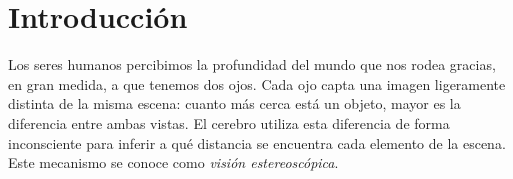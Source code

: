 \documentclass[
10pt, %
a4paper, %
oneside, %
headinclude,footinclude, %
BCOR=5mm, %
]{scrartcl}
\title{\normalfont\spacedallcaps{Geometría epipolar}} %
\author{
    \spacedlowsmallcaps{Álvaro Acedo Blanco} \\ 
    \spacedlowsmallcaps{Daniel Czepiel Babiarz} \\ 
    \spacedlowsmallcaps{Séan Beltrán Amor}
}
\date{} %
\begin{document}

\renewcommand{\sectionmark}[1]{\markright{\spacedlowsmallcaps{#1}}} %
\lehead{\mbox{\llap{\small\thepage\kern1em\color{halfgray} \vline}\color{halfgray}\hspace{0.5em}\rightmark\hfil}} %

\pagestyle{scrheadings} %


\maketitle %

\setcounter{tocdepth}{2} %

\tableofcontents %

\newpage %


\section{Introducción}

Los seres humanos percibimos la profundidad del mundo que nos rodea gracias,
en gran medida, a que tenemos dos ojos. Cada ojo capta una imagen ligeramente
distinta de la misma escena: cuanto más cerca está un objeto, mayor es la
diferencia entre ambas vistas. El cerebro utiliza esta diferencia de forma
inconsciente para inferir a qué distancia se encuentra cada elemento de la
escena. Este mecanismo se conoce como \textit{visión estereoscópica}.
\end{document}
